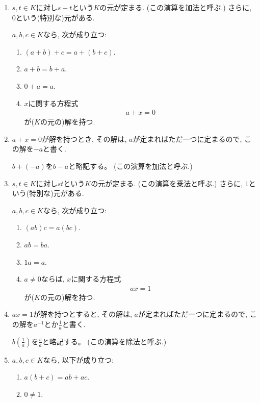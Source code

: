 \begin{enumerate}
\item
  $s,t\in K$に対し$s+t$という$K$の元が定まる.
  (この演算を加法と呼ぶ.)
  さらに, $0$という(特別な)元がある.

  $a,b,c\in K$なら, 次が成り立つ:
  \begin{enumerate}
  \item
    $(a+b)+c=a+(b+c)$.
  \item
    $a+b=b+a$.
  \item
    $0+a=a$.
  \item
    $x$に関する方程式
    \begin{align*}
      a+x=0
    \end{align*}
    が($K$の元の)解を持つ.
  \end{enumerate}
\item
  $a+x=0$が解を持つとき,
  その解は,
  $a$が定まればただ一つに定まるので,
  この解を$-a$と書く.

  $b+(-a)$を$b-a$と略記する。
  (この演算を加法と呼ぶ.)

\item
  $s,t\in K$に対し$st$という$K$の元が定まる.
  (この演算を乗法と呼ぶ.)
  さらに, $1$という(特別な)元がある.

  $a,b,c\in K$なら, 次が成り立つ:
  \begin{enumerate}
  \item
    $(ab)c=a(bc)$.
  \item
    $ab=ba$.
  \item
    $1a=a$.
  \item
    $a\neq 0$ならば,
    $x$に関する方程式
    \begin{align*}
      ax=1
    \end{align*}
    が($K$の元の)解を持つ.
  \end{enumerate}

\item
  $ax=1$が解を持つとすると,
  その解は,
  $a$が定まればただ一つに定まるので,
  この解を$a^{-1}$とか$\frac{1}{a}$と書く.

  $b(\frac{1}{a})$を$\frac{b}{a}$と略記する。
  (この演算を除法と呼ぶ.)

\item
  $a,b,c\in K$なら, 以下が成り立つ:
  \begin{enumerate}
  \item $a(b+c)=ab+ac$.
  \item $0\neq 1$.
  \end{enumerate}
\end{enumerate}

